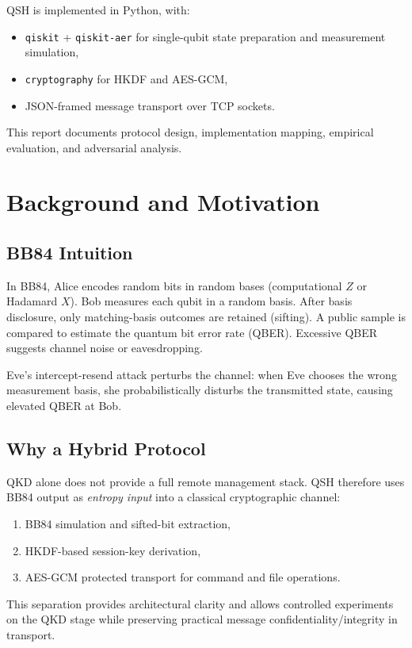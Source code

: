 \documentclass[11pt,a4paper]{article}
\begin{document}
QSH is implemented in Python, with:
\begin{itemize}[leftmargin=1.5em]
  \item \texttt{qiskit} + \texttt{qiskit-aer} for single-qubit state preparation and measurement simulation,
  \item \texttt{cryptography} for HKDF and AES-GCM,
  \item JSON-framed message transport over TCP sockets.
\end{itemize}

This report documents protocol design, implementation mapping, empirical evaluation, and adversarial analysis.

\section{Background and Motivation}
\subsection{BB84 Intuition}
In BB84, Alice encodes random bits in random bases (computational $Z$ or Hadamard $X$). Bob measures each qubit in a random basis. After basis disclosure, only matching-basis outcomes are retained (sifting). A public sample is compared to estimate the quantum bit error rate (QBER). Excessive QBER suggests channel noise or eavesdropping.

Eve's intercept-resend attack perturbs the channel: when Eve chooses the wrong measurement basis, she probabilistically disturbs the transmitted state, causing elevated QBER at Bob.

\subsection{Why a Hybrid Protocol}
QKD alone does not provide a full remote management stack. QSH therefore uses BB84 output as \emph{entropy input} into a classical cryptographic channel:
\begin{enumerate}[leftmargin=1.5em]
  \item BB84 simulation and sifted-bit extraction,
  \item HKDF-based session-key derivation,
  \item AES-GCM protected transport for command and file operations.
\end{enumerate}

This separation provides architectural clarity and allows controlled experiments on the QKD stage while preserving practical message confidentiality/integrity in transport.
\end{document}
